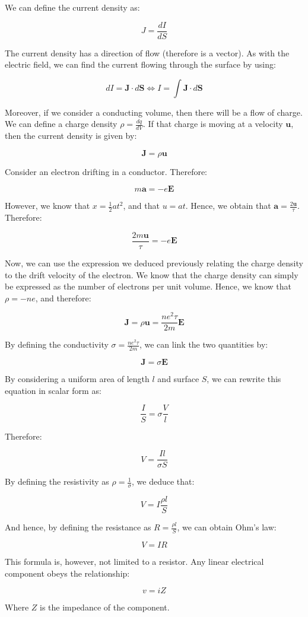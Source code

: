 \documentclass{article}
\begin{document}
\begin{definition}
    We can define the current density as:

    \[ J = \frac{dI}{dS} \]
\end{definition}

The current density has a direction of flow (therefore is a vector). As with the electric field, we can find the current flowing through the surface by using:

\[ dI = \mathbf{J} \cdot d\mathbf{S} \iff I = \int \mathbf{J} \cdot d\mathbf{S} \]

Moreover, if we consider a conducting volume, then there will be a flow of charge. We can define a charge density $\rho = \frac{dq}{dV}$. If that charge is moving at a velocity $\mathbf{u}$, then the current density is given by:

\[ \mathbf{J} = \rho\mathbf{u} \]

\begin{proposition}
Consider an electron drifting in a conductor. Therefore:

\[ m\mathbf{a} = -e\mathbf{E} \]

However, we know that $x = \frac{1}{2}at^2$, and that $u = at$. Hence, we obtain that $\mathbf{a} = \frac{2\mathbf{u}}{\tau}$. Therefore:

\[ \frac{2m\mathbf{u}}{\tau} = -e\mathbf{E} \]

Now, we can use the expression we deduced previously relating the charge density to the drift velocity of the electron. We know that the charge density can simply be expressed as the number of electrons per unit volume. Hence, we know that $\rho = -ne$, and therefore:

\[ \mathbf{J} = \rho\mathbf{u} = \frac{ne^2\tau}{2m}\mathbf{E} \]

By defining the conductivity $\sigma = \frac{ne^2\tau}{2m}$, we can link the two quantities by:

\[ \mathbf{J} = \sigma\mathbf{E} \]

By considering a uniform area of length $l$ and surface $S$, we can rewrite this equation in scalar form as:

\[ \frac{I}{S} = \sigma \frac{V}{l} \]

Therefore:

\[ V = \frac{Il}{\sigma S} \]

By defining the resistivity as $\rho = \frac{1}{\sigma}$, we deduce that:

\[ V = I \frac{\rho l}{S} \]

And hence, by defining the resistance as $R = \frac{\rho l}{S}$, we can obtain Ohm's law:

\[ V = IR \]

This formula is, however, not limited to a resistor. Any linear electrical component obeys the relationship:

\[ v = iZ \]

Where $Z$ is the impedance of the component.
\end{proposition}
\end{document}
